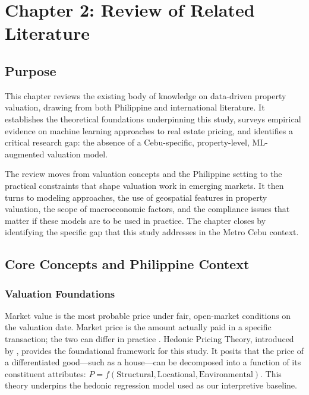 \section{Chapter 2: Review of Related Literature}\label{review-of-related-literature}

\subsection{Purpose}\label{purpose}

This chapter reviews the existing body of knowledge on data-driven property valuation, drawing from both Philippine and international literature. It establishes the theoretical foundations underpinning this study, surveys empirical evidence on machine learning approaches to real estate pricing, and identifies a critical research gap: the absence of a Cebu-specific, property-level, ML-augmented valuation model.

The review moves from valuation concepts and the Philippine setting to the practical constraints that shape valuation work in emerging markets. It then turns to modeling approaches, the use of geospatial features in property valuation, the scope of macroeconomic factors, and the compliance issues that matter if these models are to be used in practice. The chapter closes by identifying the specific gap that this study addresses in the Metro Cebu context.


\subsection{Core Concepts and Philippine Context}\label{core-concepts-and-philippine-context}

\subsubsection{Valuation Foundations}\label{valuation-foundations}

Market value is the most probable price under fair, open-market conditions on the valuation date. Market price is the amount actually paid in a specific transaction; the two can differ in practice \parencite{pvs2018}. Hedonic Pricing Theory, introduced by \textcite{rosen1974}, provides the foundational framework for this study. It posits that the price of a differentiated good---such as a house---can be decomposed into a function of its constituent attributes: $P = f(\text{Structural}, \text{Locational}, \text{Environmental})$. This theory underpins the hedonic regression model used as our interpretive baseline.

